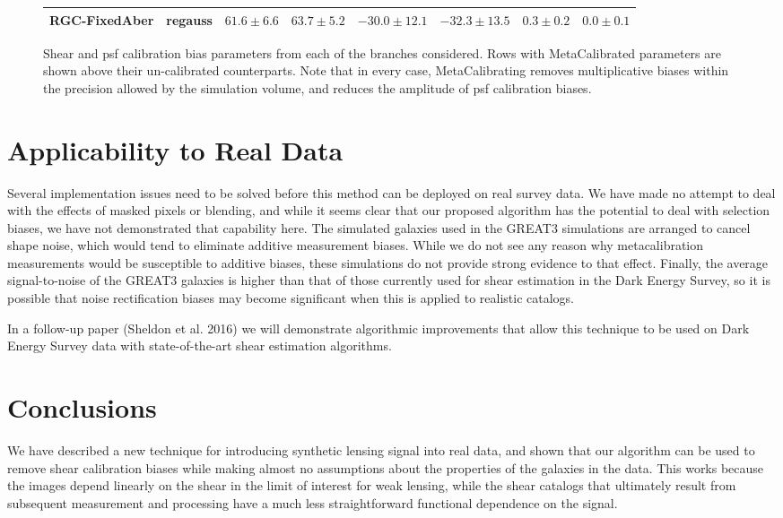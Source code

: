 \documentclass[iop]{emulateapj}
\begin{document}
\begin{figure}
{\begin{tabular}{l  c |cc | cc |cc }
RGC-FixedAber  & regauss  &  $61.6\pm6.6$ & $63.7\pm5.2$  & $-30.0\pm12.1$ & $-32.3\pm13.5$ &  $0.3\pm0.2$ & $0.0\pm0.1$ \\
\hline
\end{tabular}
}
\caption{Shear and psf calibration bias parameters from each of the
  branches considered. Rows with MetaCalibrated parameters are shown
  above their un-calibrated counterparts. Note that in every case,
  MetaCalibrating removes multiplicative biases within the precision
  allowed by the simulation volume, and reduces the amplitude of psf
  calibration biases.}
\label{table:results}
\end{figure}

\section{Applicability to Real Data}
Several implementation issues need to be solved before this method can
be deployed on real survey data. We have made no attempt to deal with
the effects of masked pixels or blending, and while it seems clear
that our proposed algorithm has the potential to deal with selection
biases, we have not demonstrated that capability here.  The simulated
galaxies used in the GREAT3 simulations are arranged to cancel shape
noise, which would tend to eliminate additive measurement
biases. While we do not see any reason why metacalibration
measurements would be susceptible to additive biases, these
simulations do not provide strong evidence to that effect. Finally,
the average signal-to-noise of the GREAT3 galaxies is higher than that
of those currently used for shear estimation in the Dark Energy
Survey, so it is possible that noise rectification biases may become
significant when this is applied to realistic catalogs.

In a follow-up paper (Sheldon et al. 2016) we will demonstrate
algorithmic improvements that allow this technique to be used on Dark
Energy Survey data with state-of-the-art shear estimation algorithms.

\section{Conclusions}
We have described a new technique for introducing synthetic lensing
signal into real data, and shown that our algorithm can be used to
remove shear calibration biases while making almost no assumptions
about the properties of the galaxies in the data. This works because
the images depend linearly on the shear in the limit of interest for
weak lensing, while the shear catalogs that ultimately result from
subsequent measurement and processing have a much less straightforward
functional dependence on the signal.
\end{document}
